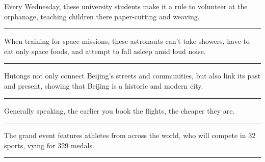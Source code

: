 \documentclass[11pt,a4paper]{article}
\newcommand{\num}[1]{\makebox[1.9em][r]{#1.}\hspace{0.3em}}
\newcommand{\wline}{\noindent\rule{\linewidth}{0.4pt}}
\begin{document}
\begin{minipage}{\linewidth}

\num{14}Every Wednesday, these university students make it a rule to volunteer at the orphanage, teaching children there paper-cutting and weaving.

\vspace{0.25em}

\wline

\end{minipage}

\begin{minipage}{\linewidth}

\num{15}When training for space missions, these astronauts can’t take showers, have to eat only space foods, and attempt to fall asleep amid loud noise.

\vspace{0.25em}

\wline

\end{minipage}

\begin{minipage}{\linewidth}

\num{16}Hutongs not only connect Beijing’s streets and communities, but also link its past and present, showing that Beijing is a historic and modern city.

\vspace{0.25em}

\wline

\end{minipage}

\vspace{0.35em}\vspace{0.15em}

\begin{minipage}{\linewidth}

\num{17}Generally speaking, the earlier you book the flights, the cheaper they are.

\vspace{0.25em}

\wline

\end{minipage}

\begin{minipage}{\linewidth}

\num{18}The grand event features athletes from across the world, who will compete in 32 sports, vying for 329 medals.

\vspace{0.25em}

\wline

\end{minipage}
\end{document}
